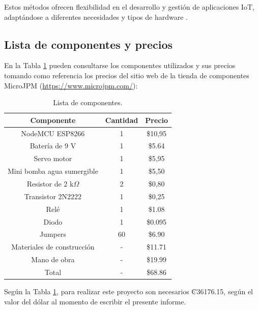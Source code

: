 Estos métodos ofrecen flexibilidad en el desarrollo y gestión de aplicaciones IoT, adaptándose a diferentes necesidades y tipos de hardware \cite{BK}.

\subsection{Lista de componentes y precios}
En la Tabla \ref{table:Equipo} pueden consultarse los componentes utilizados y sus precios tomando como referencia los precios del sitio web de la tienda de componentes MicroJPM (\url{https://www.microjpm.com/}): 

\begin{table}[H]
\caption{Lista de componentes.}
\begin{center}
\begin{tabular}{c|c|c}
\hline
\textbf{Componente}&\textbf{Cantidad}&\textbf{Precio}\\
\hline
NodeMCU ESP8266 & 1 & \$10,95\\
Batería de 9 V & 1 & \$5.64\\
Servo motor & 1 & \$5,95\\
Mini bomba agua sumergible & 1 & \$5,50\\
Resistor de  2 k$\Omega$ & 2 & \$0,80\\
Transistor 2N2222 & 1 & \$0,25\\ 
Relé & 1 & \$1.08\\
Diodo & 1 & \$0.095\\ 
Jumpers & 60 & \$6.90\\
Materiales de construcción & - & \$11.71\\
Mano de obra & - & \$19.99\\
\hline
Total & - & \$68.86\\
\end{tabular} \label{table:Equipo}
\end{center}
\end{table}


Según la Tabla \ref{table:Equipo}, para realizar este proyecto son necesarios ₡36176.15, según el valor del dólar al momento de escribir el presente informe. 